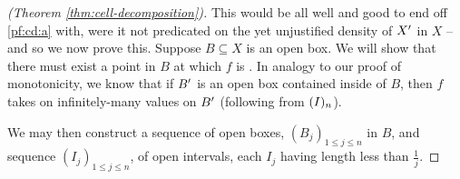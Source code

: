 \begin{proof}[\CD (Theorem \ref{thm:cell-decomposition})]
  This would be all well and good to end off \ref{pf:cd:a} with, were it not predicated on the yet unjustified density of $\Xprime$ in $X$ -- and so we now prove this. Suppose $B \subseteq X$ is an open box. We will show that there must exist a point in $B$ at which $f$ is \cont. In analogy to our proof of monotonicity, we know that if $\Xprime[B]$ is an open box contained inside of $B$, then $f$ takes on infinitely-many values on $\Xprime[B]$ (following from $\In$).

  We may then construct a sequence of open boxes, $(B_j)_{1 \leq j \leq n}$ in $B$, and sequence $(I_j)_{1 \leq j \leq n}$, of open intervals, each $I_j$ having length less than $\frac{1}{j}$.




\end{proof}




%
